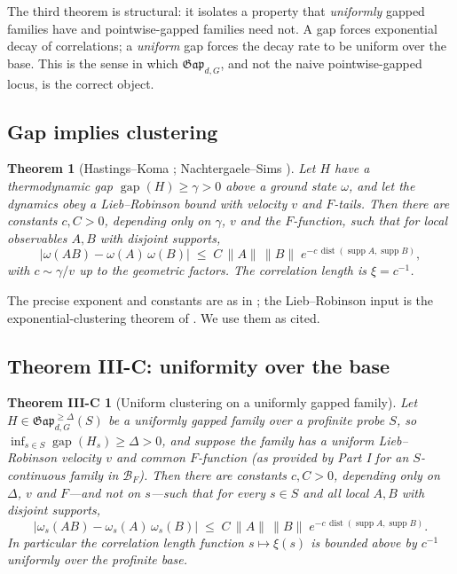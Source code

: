 \documentclass[12pt]{article}
\newcommand{\Ffun}{F}                          %
\newcommand{\BF}{\mathcal{B}_{F}}              %
\newcommand{\Gap}{\mathfrak{Gap}}              %
\newcommand{\gapof}[1]{\operatorname{gap}(#1)} %
\newcommand{\gapbound}{\Delta}                  %
\newcommand{\norm}[1]{\lVert #1 \rVert}
\newcommand{\supp}{\operatorname{supp}}
\newcommand{\dist}{\operatorname{dist}}
\DeclareMathOperator*{\einf}{inf}
\theoremstyle{plain}
\newtheorem{theorem}{Theorem}[section]
\newtheorem*{thmC}{Theorem III-C}
\theoremstyle{definition}
\theoremstyle{remark}
\begin{document}
The third theorem is structural: it isolates a property that \emph{uniformly} gapped
families have and pointwise-gapped families need not. A gap forces exponential decay
of correlations; a \emph{uniform} gap forces the decay rate to be uniform over the
base. This is the sense in which $\Gap_{d,G}$, and not the naive pointwise-gapped
locus, is the correct object.

\subsection{Gap implies clustering}
\label{sec:clustering-gap}

\begin{theorem}[Hastings--Koma \cite{hastings-koma}; Nachtergaele--Sims
\cite{nachtergaele-sims-clustering}]
\label{thm:hk}
Let $H$ have a thermodynamic gap $\gapof{H}\ge\gamma>0$ above a ground state
$\omega$, and let the dynamics obey a Lieb--Robinson bound with velocity $v$ and
$\Ffun$-tails. Then there are constants $c,C>0$, depending only on $\gamma$, $v$ and
the $\Ffun$-function, such that for local observables $A,B$ with disjoint supports,
\[
\big\lvert\omega(AB)-\omega(A)\,\omega(B)\big\rvert
\;\le\;C\,\norm{A}\,\norm{B}\;e^{-c\,\dist(\supp A,\supp B)},
\]
with $c\sim\gamma/v$ up to the geometric factors. The correlation length is
$\xi=c^{-1}$.
\end{theorem}

The precise exponent and constants are as in \cite{hastings-koma}; the
Lieb--Robinson input is the exponential-clustering theorem of
\cite{nachtergaele-sims-clustering}. We use them as cited.

\subsection{Theorem III-C: uniformity over the base}
\label{sec:clustering-thmC}

\begin{thmC}[Uniform clustering on a uniformly gapped family]
\label{thm:IIIC}
Let $H\in\Gap_{d,G}^{\ge\gapbound}(S)$ be a uniformly gapped family over a profinite
probe $S$, so $\einf_{s\in S}\gapof{H_s}\ge\gapbound>0$, and suppose the family has a
uniform Lieb--Robinson velocity $v$ and common $\Ffun$-function (as provided by Part I
for an $S$-continuous family in $\BF$). Then there are constants $c,C>0$, depending
only on $\gapbound$, $v$ and $\Ffun$---and \emph{not} on $s$---such that for every
$s\in S$ and all local $A,B$ with disjoint supports,
\[
\big\lvert\omega_s(AB)-\omega_s(A)\,\omega_s(B)\big\rvert
\;\le\;C\,\norm{A}\,\norm{B}\;e^{-c\,\dist(\supp A,\supp B)}.
\]
In particular the correlation length function $s\mapsto\xi(s)$ is bounded above by
$c^{-1}$ uniformly over the profinite base.
\end{thmC}
\end{document}
